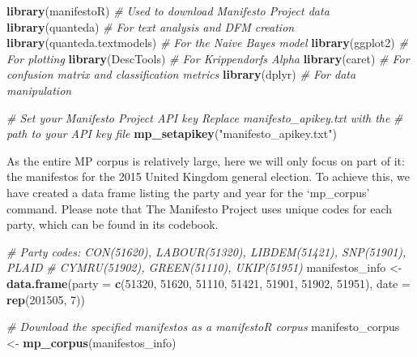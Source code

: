 \documentclass[
]{book}
\newenvironment{Shaded}{\begin{snugshade}}{\end{snugshade}}
\newcommand{\AttributeTok}[1]{\textcolor[rgb]{0.13,0.29,0.53}{#1}}
\newcommand{\CommentTok}[1]{\textcolor[rgb]{0.56,0.35,0.01}{\textit{#1}}}
\newcommand{\DecValTok}[1]{\textcolor[rgb]{0.00,0.00,0.81}{#1}}
\newcommand{\FunctionTok}[1]{\textcolor[rgb]{0.13,0.29,0.53}{\textbf{#1}}}
\newcommand{\NormalTok}[1]{#1}
\newcommand{\OtherTok}[1]{\textcolor[rgb]{0.56,0.35,0.01}{#1}}
\newcommand{\StringTok}[1]{\textcolor[rgb]{0.31,0.60,0.02}{#1}}
\begin{document}
\begin{Shaded}
\begin{Highlighting}[]
\FunctionTok{library}\NormalTok{(manifestoR)  }\CommentTok{\# Used to download Manifesto Project data}
\FunctionTok{library}\NormalTok{(quanteda)  }\CommentTok{\# For text analysis and DFM creation}
\FunctionTok{library}\NormalTok{(quanteda.textmodels)  }\CommentTok{\# For the Naive Bayes model}
\FunctionTok{library}\NormalTok{(ggplot2)  }\CommentTok{\# For plotting}
\FunctionTok{library}\NormalTok{(DescTools)  }\CommentTok{\# For Krippendorf\textquotesingle{}s Alpha}
\FunctionTok{library}\NormalTok{(caret)  }\CommentTok{\# For confusion matrix and classification metrics}
\FunctionTok{library}\NormalTok{(dplyr)  }\CommentTok{\# For data manipulation}

\CommentTok{\# Set your Manifesto Project API key Replace \textquotesingle{}manifesto\_apikey.txt\textquotesingle{} with the}
\CommentTok{\# path to your API key file}
\FunctionTok{mp\_setapikey}\NormalTok{(}\StringTok{"manifesto\_apikey.txt"}\NormalTok{)}
\end{Highlighting}
\end{Shaded}

As the entire MP corpus is relatively large, here we will only focus on part of it: the manifestos for the 2015 United Kingdom general election. To achieve this, we have created a data frame listing the party and year for the `mp\_corpus' command. Please note that The Manifesto Project uses unique codes for each party, which can be found in its codebook.

\begin{Shaded}
\begin{Highlighting}[]
\CommentTok{\# Party codes: CON(51620), LABOUR(51320), LIBDEM(51421), SNP(51901), PLAID}
\CommentTok{\# CYMRU(51902), GREEN(51110), UKIP(51951)}
\NormalTok{manifestos\_info }\OtherTok{\textless{}{-}} \FunctionTok{data.frame}\NormalTok{(}\AttributeTok{party =} \FunctionTok{c}\NormalTok{(}\DecValTok{51320}\NormalTok{, }\DecValTok{51620}\NormalTok{, }\DecValTok{51110}\NormalTok{, }\DecValTok{51421}\NormalTok{, }\DecValTok{51901}\NormalTok{, }\DecValTok{51902}\NormalTok{,}
    \DecValTok{51951}\NormalTok{), }\AttributeTok{date =} \FunctionTok{rep}\NormalTok{(}\DecValTok{201505}\NormalTok{, }\DecValTok{7}\NormalTok{))}

\CommentTok{\# Download the specified manifestos as a manifestoR corpus}
\NormalTok{manifesto\_corpus }\OtherTok{\textless{}{-}} \FunctionTok{mp\_corpus}\NormalTok{(manifestos\_info)}
\end{Highlighting}
\end{Shaded}
\end{document}
